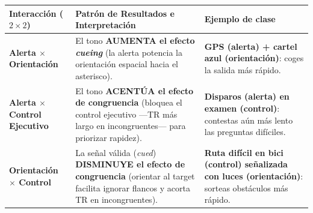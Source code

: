 \documentclass[11pt,a4paper]{article}
\begin{document}
\vspace{0.3em}
\begin{center}
\renewcommand{\arraystretch}{1.4}
\begin{tabularx}{\textwidth}{@{}>{\raggedright\arraybackslash}p{3.4cm}>{\raggedright\arraybackslash}X>{\raggedright\arraybackslash}p{5.1cm}@{}}
\toprule
\rowcolor{Primary!15}
\textbf{Interacción ($2 \times 2$)} & \textbf{Patrón de Resultados e Interpretación} & \textbf{Ejemplo de clase} \\
\midrule
\textbf{Alerta $\times$ Orientación} & El tono \textbf{AUMENTA el efecto \textit{cueing}} (la alerta potencia la orientación espacial hacia el asterisco). & \textbf{GPS (alerta) + cartel azul (orientación)}: coges la salida más rápido. \\
\textbf{Alerta $\times$ Control Ejecutivo} & El tono \textbf{ACENTÚA el efecto de congruencia} (bloquea el control ejecutivo —TR más largo en incongruentes— para priorizar rapidez). & \textbf{Disparos (alerta) en examen (control)}: contestas aún más lento las preguntas difíciles. \\
\textbf{Orientación $\times$ Control} & La señal válida (\textit{cued}) \textbf{DISMINUYE el efecto de congruencia} (orientar al target facilita ignorar flancos y acorta TR en incongruentes). & \textbf{Ruta difícil en bici (control) señalizada con luces (orientación)}: sorteas obstáculos más rápido. \\
\bottomrule
\end{tabularx}
\end{center}
\end{document}
